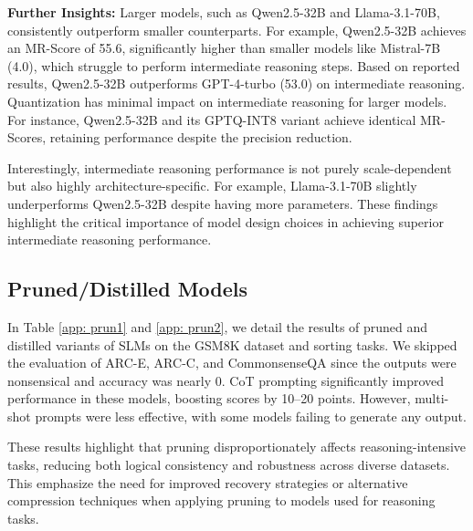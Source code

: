 \textbf{Further Insights:} Larger models, such as Qwen2.5-32B and Llama-3.1-70B, consistently outperform smaller counterparts. For example, Qwen2.5-32B achieves an MR-Score of 55.6, significantly higher than smaller models like Mistral-7B (4.0), which struggle to perform intermediate reasoning steps. Based on reported results, Qwen2.5-32B outperforms GPT-4-turbo (53.0) on intermediate reasoning. Quantization has minimal impact on intermediate reasoning for larger models. For instance, Qwen2.5-32B and its GPTQ-INT8 variant achieve identical MR-Scores, retaining performance despite the precision reduction. \medskip

Interestingly, intermediate reasoning performance is not purely scale-dependent but also highly architecture-specific. For example, Llama-3.1-70B slightly underperforms Qwen2.5-32B despite having more parameters. These findings highlight the critical importance of model design choices in achieving superior intermediate reasoning performance.


\subsection{Pruned/Distilled Models}
In Table \ref{app: prun1} and \ref{app: prun2}, we detail the results of pruned and distilled variants of SLMs on the GSM8K dataset and sorting tasks. We skipped the evaluation of ARC-E, ARC-C, and CommonsenseQA since the outputs were nonsensical and accuracy was nearly 0. CoT prompting significantly improved performance in these models, boosting scores by 10–20 points. However, multi-shot prompts were less effective, with some models failing to generate any output.\medskip

These results highlight that pruning disproportionately affects reasoning-intensive tasks, reducing both logical consistency and robustness across diverse datasets. This emphasize the need for improved recovery strategies or alternative compression techniques when applying pruning to models used for reasoning tasks.







